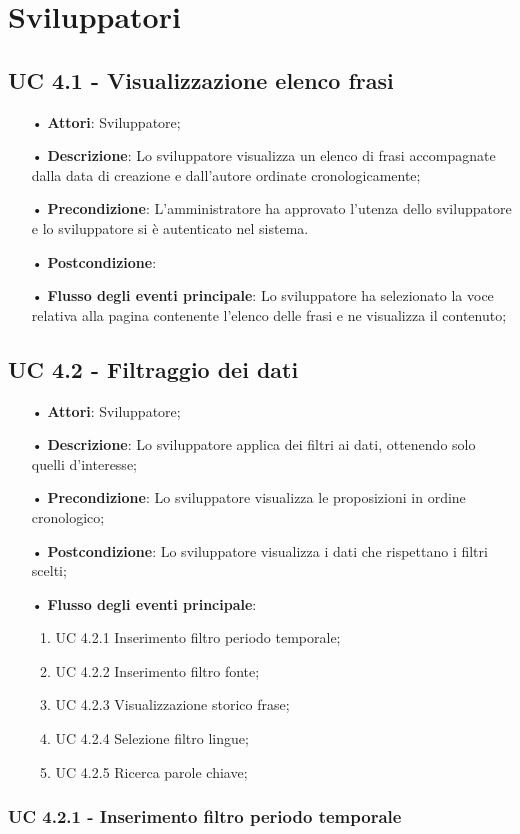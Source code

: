 \section{Sviluppatori}
\subsection{UC 4.1 - Visualizzazione elenco frasi}
\begin{itemize}
\item[•]\textbf{Attori}: Sviluppatore;
\item[•]\textbf{Descrizione}: Lo sviluppatore visualizza un elenco di frasi accompagnate dalla data di creazione e dall’autore ordinate cronologicamente;
\item[•]\textbf{Precondizione}:  L'amministratore ha approvato l’utenza dello sviluppatore e lo sviluppatore si è autenticato nel sistema.
\item[•]\textbf{Postcondizione}: 
\item[•]\textbf{Flusso degli eventi principale}: Lo sviluppatore ha selezionato la voce relativa alla pagina contenente l’elenco delle frasi e ne visualizza il contenuto; 
\end{itemize}
\subsection{UC 4.2 - Filtraggio dei dati}
\begin{itemize}
\item[•]\textbf{Attori}: Sviluppatore;
\item[•]\textbf{Descrizione}: Lo sviluppatore applica dei filtri ai dati, ottenendo solo quelli d’interesse;
\item[•]\textbf{Precondizione}: Lo sviluppatore visualizza le proposizioni in ordine cronologico;
\item[•]\textbf{Postcondizione}: Lo sviluppatore visualizza i dati che rispettano i filtri scelti;
\item[•]\textbf{Flusso degli eventi principale}:
\begin{enumerate}
\item UC 4.2.1 Inserimento filtro periodo temporale;
\item UC 4.2.2 Inserimento filtro fonte;
\item UC 4.2.3 Visualizzazione storico frase;
\item UC 4.2.4 Selezione filtro lingue;
\item UC 4.2.5 Ricerca parole chiave;
\end{enumerate}
\end{itemize}
\subsubsection{UC 4.2.1 - Inserimento filtro periodo temporale}